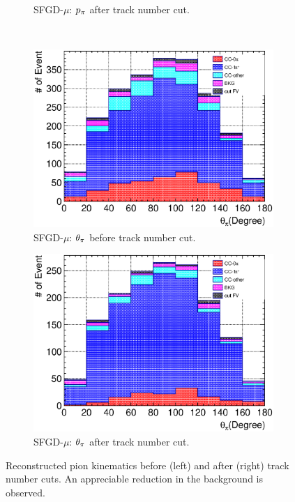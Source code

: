 \begin{figure}[ht]
\begin{subfigure}{\dbfigwid\textwidth}
                  \caption{SFGD-$\mu$: $p_{\pi}$ after track number cut.}
                  \label{subfig:tlpi-ppi-af-trknumcut-sfg}
             \end{subfigure}
             \\
             \begin{subfigure}{\dbfigwid\textwidth}
                  \includegraphics[width=\textwidth]{figures/sel/SFGmu_theta_pi_stack_al8.eps}
                  \caption{SFGD-$\mu$: $\theta_{\pi}$ before track number cut.}
                  \label{subfig:tlpi-tpi-bf-trknumcut-sfg}
             \end{subfigure}
             \begin{subfigure}{\dbfigwid\textwidth}
                  \includegraphics[width=\textwidth]{figures/sel/SFGmu_theta_pi_stack_al9.eps}
                  \caption{SFGD-$\mu$: $\theta_{\pi}$ after track number cut.}
                  \label{subfig:tlpi-tpi-af-trknumcut-sfg}
             \end{subfigure}
             \caption{Reconstructed pion kinematics before (left) and after (right) track number cuts. An appreciable reduction in the background is observed.}
             \label{fig:tl-trknum-cut-res}
          \end{figure}

